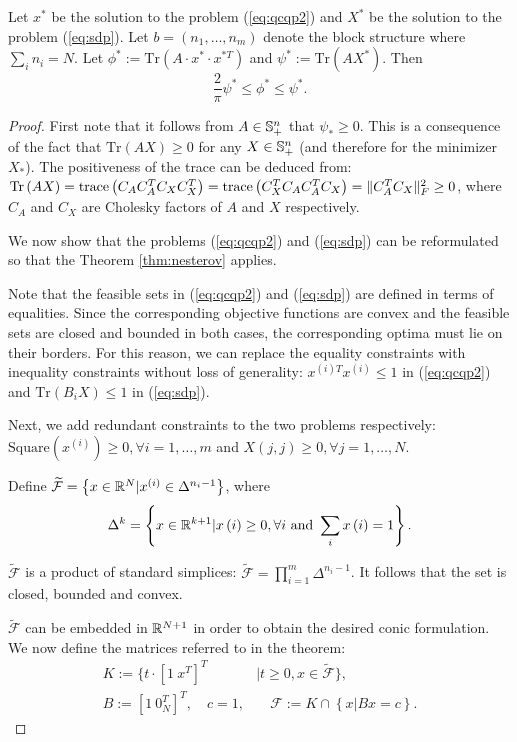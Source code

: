 \begin{theorem}
Let
$x^{*}$ be the solution to the problem (\ref{eq:qcqp2}) and
$X^*$ be the solution to the problem (\ref{eq:sdp}).
Let $b = \left(n_1,\ldots,n_m\right)$ denote the block structure where $\sum_i n_i = N$.
Let $\phi^*:= \mathrm{Tr}\left(A \cdot x^{*} \cdot x^{*T}\right)$ and
$\psi^* := \mathrm{Tr}\left(A X^{*}\right)$.
Then $$\frac{2}{\pi} \psi^* \leq \phi^* \leq \psi^*.$$
\end{theorem}

\begin{proof}
First note that it follows from $A \in \mathbb{S}_{+}^n$ that $\psi_* \geq
0$. This is a consequence of the fact that $\mathrm{Tr}\left(A X \right) \geq 0$ for any $X \in \mathbb{S}_+^n$
(and therefore for the minimizer $X_*$). The positiveness of the trace can be deduced from:
$\mathrm{Tr}\left(A X \right) = \mathrm{trace}\left(C_A C_A^T C_X C_X^T \right) =
\mathrm{trace}\left(C_X^T C_A C_A^T C_X \right) = \lVert C_A^T C_X\rVert_F^2 \geq 0 $,
where $C_A$ and $C_X$ are Cholesky factors of $A$ and $X$ respectively.

We now show that the problems (\ref{eq:qcqp2}) and (\ref{eq:sdp}) can be reformulated
so that the Theorem \ref{thm:nesterov} applies.

Note that the feasible sets in (\ref{eq:qcqp2}) and
(\ref{eq:sdp}) are defined in terms of equalities. Since the corresponding objective
functions are convex and the feasible sets are closed and bounded in
both cases, the corresponding optima must lie on their borders. For this reason, we can
replace the equality constraints with inequality constraints without loss of generality:
$x^{(i)T}x^{(i)} \leq 1$ in (\ref{eq:qcqp2}) and $\mathrm{Tr} \left(B_i X\right) \leq 1$
in (\ref{eq:sdp}).

Next, we add redundant constraints to the two problems respectively:
$\mathrm{Square}\left(x^{(i)}\right) \geq 0, \forall i = 1,\ldots,m$
and $X\left(j,j\right) \geq 0, \forall j = 1,\ldots, N$.

Define $\widetilde{\mathcal{F}} = \left\{x \in \mathbb{R}^N | x^{(i)} \in \Delta^{n_i -1} \right\}$,
where $$\Delta^{k} = \left\{ x \in \mathbb{R}^{k+1} | x\left(i\right) \geq 0, \forall i ~\mathrm{and}~ \sum_i x\left(i\right) = 1 \right\}.$$

$\widetilde{\mathcal{F}}$ is a product of standard simplices: $\widetilde{\mathcal{F}} = \prod_{i = 1}^m \Delta^{n_i -1}$. It follows that the set is closed, bounded and convex.

$\widetilde{\mathcal{F}}$ can be embedded in $\mathbb{R}^{N+1}$ in order to obtain the desired conic 
formulation. We now define the matrices referred to in the theorem:
\begin{align*}
K := \{ t\cdot \left[1~ x^T\right]^T &| t \geq 0, x \in \widetilde{\mathcal{F}} \}, \\
B := \left[1~ 0_N^T\right]^T,\quad c = 1,& \quad \mathcal{F} := K \cap \left\{x | B x = c \right\}.
\end{align*}


\end{proof}
